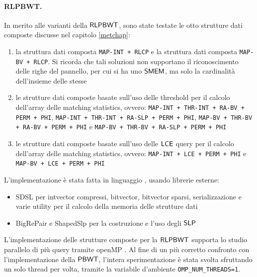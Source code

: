 \paragraph{RLPBWT.}
In merito alle varianti della $\mbox{\rm {\sf RLPBWT}}$, sono state testate le otto
strutture dati composte discusse nel capitolo \ref{metchap}:
\begin{enumerate}
  \item la struttura dati composta \texttt{MAP-INT + RLCP} e la struttura dati
  composta \texttt{MAP-BV + RLCP}. Si ricorda che tali soluzioni non supportano
  il riconoscimento delle righe del pannello, per cui si ha uno $\mbox{\rm {\sf SMEM}}$, ma
  solo la cardinalità dell'insieme delle stesse
  \item le strutture dati composte basate sull'uso delle threshold per
  il calcolo dell'array delle matching statistics, 
  ovvero: \texttt{MAP-INT + THR-INT + RA-BV + PERM + PHI},  \texttt{MAP-INT +
    THR-INT + RA-SLP + PERM + PHI}, \texttt{MAP-BV + THR-BV + RA-BV + PERM +
    PHI} e \texttt{MAP-BV + THR-BV + RA-SLP + PERM + PHI} 
  \item le strutture dati composte basate sull'uso delle $\mbox{\rm {\sf LCE}}$ query
  per
  il calcolo dell'array delle matching statistics,
  ovvero: \texttt{MAP-INT + LCE + PERM + PHI} e \texttt{MAP-BV + LCE + PERM +
    PHI}  
\end{enumerate}
L'implementazione è stata fatta in linguaggio \Cplusplus, usando
librerie esterne:
\begin{itemize}
  \item SDSL per intvector compressi,
  bitvector, bitvector sparsi, serializzazione e varie utility
  per il calcolo della memoria delle strutture dati
  \item BigRePair e ShapedSlp per la costruzione e l'uso degli $\mbox{\rm {\sf SLP}}$ 
\end{itemize}
L'implementazione delle strutture composte per la
$\mbox{\rm {\sf RLPBWT}}$ supporta lo studio parallelo di più query tramite
openMP \cite{openmp}. Al fine di un più 
corretto confronto con l'implementazione della $\mbox{\rm {\sf PBWT}}$,
l'intera sperimentazione è stata
svolta sfruttando un solo thread per volta, tramite la variabile
d'ambiente \texttt{OMP\_NUM\_THREADS=1}.
